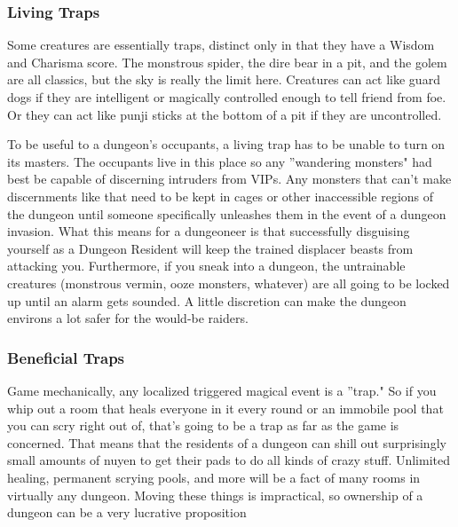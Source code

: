 \subsubsection{Living Traps}

Some creatures are essentially traps, distinct only in that they have a Wisdom and Charisma score. The monstrous spider, the dire bear in a pit, and the golem are all classics, but the sky is really the limit here. Creatures can act like guard dogs if they are intelligent or magically controlled enough to tell friend from foe. Or they can act like punji sticks at the bottom of a pit if they are uncontrolled.

To be useful to a dungeon's occupants, a living trap has to be unable to turn on its masters. The occupants live in this place so any ''wandering monsters" had best be capable of discerning intruders from VIPs. Any monsters that can't make discernments like that need to be kept in cages or other inaccessible regions of the dungeon until someone specifically unleashes them in the event of a dungeon invasion. What this means for a dungeoneer is that successfully disguising yourself as a Dungeon Resident will keep the trained displacer beasts from attacking you. Furthermore, if you sneak into a dungeon, the untrainable creatures (monstrous vermin, ooze monsters, whatever) are all going to be locked up until an alarm gets sounded. A little discretion can make the dungeon environs a lot safer for the would-be raiders.

\subsubsection{Beneficial Traps}

Game mechanically, any localized triggered magical event is a ''trap." So if you whip out a room that heals everyone in it every round or an immobile pool that you can scry right out of, that's going to be a trap as far as the game is concerned. That means that the residents of a dungeon can shill out surprisingly small amounts of nuyen to get their pads to do all kinds of crazy stuff. Unlimited healing, permanent scrying pools, and more will be a fact of many rooms in virtually any dungeon. Moving these things is impractical, so ownership of a dungeon can be a very lucrative proposition
